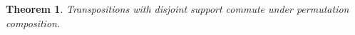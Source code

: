 \documentclass{article}
\newtheorem{theorem}{Theorem}
\begin{document}
\begin{theorem}\label{thm:R07}
Transpositions with disjoint support commute under permutation composition.
\end{theorem}
\end{document}
